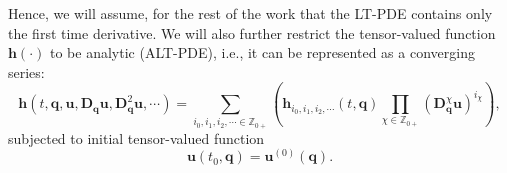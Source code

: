 \documentclass[preprint, 12pt]{revtex4-2}
\numberwithin{equation}{section}
\begin{document}
Hence, we will assume, for the rest of the work that the LT-PDE contains only the first time derivative. We will also further restrict the tensor-valued function $\mathbf{h}(\cdot)$ to be analytic (ALT-PDE), i.e., it can be represented as a converging series:
\begin{equation}\label{eq:Analytic Function}
    \mathbf{h}(t, \mathbf{q}, \mathbf{u}, \mathbf{D}_\mathbf{q}\mathbf{u}, \mathbf{D}_\mathbf{q}^2\mathbf{u}, \cdots) = \sum_{i_0, i_1, i_2, \cdots\in\mathbb{Z}_{0+}} \left(\mathbf{h}_{i_0, i_1, i_2, \cdots}(t,\mathbf{q})\prod_{\chi\in\mathbb{Z}_{0+}}\left(\mathbf{D}_\mathbf{q}^\chi\mathbf{u}\right)^{i_\chi}\right),
\end{equation}
subjected to initial tensor-valued function
\begin{equation}\label{eq:Initial Function}
    \mathbf{u}(t_0, \mathbf{q}) = \mathbf{u}^{(0)}(\mathbf{q}).
\end{equation}
\end{document}
